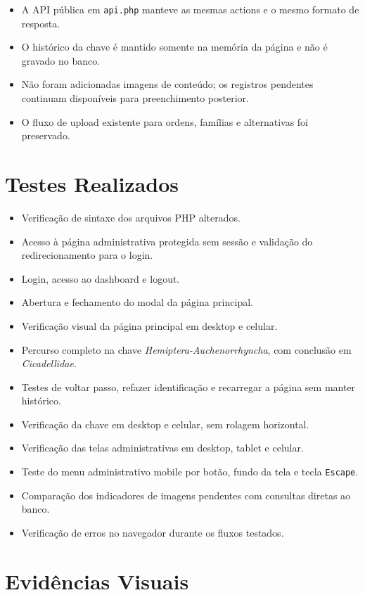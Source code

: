 \documentclass[12pt,a4paper]{article}
\begin{document}
\begin{itemize}
  \item A API pública em \texttt{api.php} manteve as mesmas actions e o mesmo formato de resposta.
  \item O histórico da chave é mantido somente na memória da página e não é gravado no banco.
  \item Não foram adicionadas imagens de conteúdo; os registros pendentes continuam disponíveis para preenchimento posterior.
  \item O fluxo de upload existente para ordens, famílias e alternativas foi preservado.
\end{itemize}

\section{Testes Realizados}

\begin{itemize}
  \item Verificação de sintaxe dos arquivos PHP alterados.
  \item Acesso à página administrativa protegida sem sessão e validação do redirecionamento para o login.
  \item Login, acesso ao dashboard e logout.
  \item Abertura e fechamento do modal da página principal.
  \item Verificação visual da página principal em desktop e celular.
  \item Percurso completo na chave \emph{Hemiptera-Auchenorrhyncha}, com conclusão em \emph{Cicadellidae}.
  \item Testes de voltar passo, refazer identificação e recarregar a página sem manter histórico.
  \item Verificação da chave em desktop e celular, sem rolagem horizontal.
  \item Verificação das telas administrativas em desktop, tablet e celular.
  \item Teste do menu administrativo mobile por botão, fundo da tela e tecla \texttt{Escape}.
  \item Comparação dos indicadores de imagens pendentes com consultas diretas ao banco.
  \item Verificação de erros no navegador durante os fluxos testados.
\end{itemize}

\clearpage
\section{Evidências Visuais}
\end{document}
